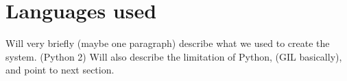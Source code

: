 \section{Languages used}

Will very briefly (maybe one paragraph) describe what we used to create the system. (Python 2) Will also describe the limitation of Python, (GIL basically), and point to next section.
